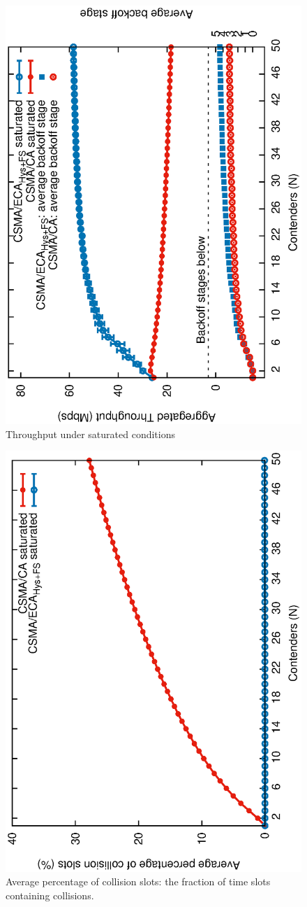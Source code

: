 	\begin{figure}[tb]
	\centering
		\includegraphics[width=0.7\linewidth,angle=-90]{figures/saturated/throughput-saturated-w-BOS/throughput-saturated-w-BOS-TON.eps}
		\caption{Throughput under saturated conditions}
		\label{fig:throughput-sat}
	\end{figure}
	
	\begin{figure}[tb]
	\centering
		\includegraphics[width=0.7\linewidth,angle=-90]{figures/saturated/collisions-saturated/collisions-saturated-TON.eps}
		\caption{Average percentage of collision slots: the fraction of time slots containing collisions.}
		\label{fig:collisions-sat}
	\end{figure}
	
